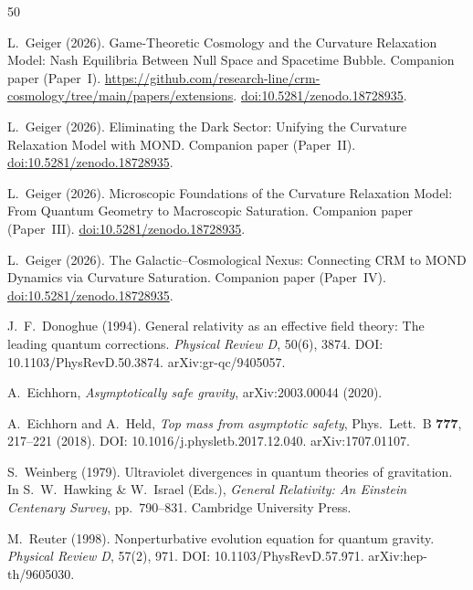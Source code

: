 \documentclass[aps,prd,twocolumn,superscriptaddress,nofootinbib]{revtex4-2}
\begin{document}
\begin{thebibliography}{50}

L.~Geiger (2026).
Game-Theoretic Cosmology and the Curvature Relaxation Model: Nash Equilibria Between Null Space and Spacetime Bubble.
Companion paper (Paper~I).
\url{https://github.com/research-line/crm-cosmology/tree/main/papers/extensions}.
\href{https://doi.org/10.5281/zenodo.18728935}{doi:10.5281/zenodo.18728935}.

L.~Geiger (2026).
Eliminating the Dark Sector: Unifying the Curvature Relaxation Model with MOND.
Companion paper (Paper~II).
\href{https://doi.org/10.5281/zenodo.18728935}{doi:10.5281/zenodo.18728935}.

L.~Geiger (2026).
Microscopic Foundations of the Curvature Relaxation Model: From Quantum Geometry to Macroscopic Saturation.
Companion paper (Paper~III).
\href{https://doi.org/10.5281/zenodo.18728935}{doi:10.5281/zenodo.18728935}.

L.~Geiger (2026).
The Galactic--Cosmological Nexus: Connecting CRM to MOND Dynamics via Curvature Saturation.
Companion paper (Paper~IV).
\href{https://doi.org/10.5281/zenodo.18728935}{doi:10.5281/zenodo.18728935}.

J.~F.~Donoghue (1994).
General relativity as an effective field theory: The leading quantum corrections.
\textit{Physical Review D}, 50(6), 3874.
DOI: 10.1103/PhysRevD.50.3874.
arXiv:gr-qc/9405057.

A.~Eichhorn,
\textit{Asymptotically safe gravity},
arXiv:2003.00044 (2020).

A.~Eichhorn and A.~Held,
\textit{Top mass from asymptotic safety},
Phys.\ Lett.\ B \textbf{777}, 217--221 (2018).
DOI: 10.1016/j.physletb.2017.12.040.
arXiv:1707.01107.

S.~Weinberg (1979).
Ultraviolet divergences in quantum theories of gravitation.
In S.~W.~Hawking \& W.~Israel (Eds.), \textit{General Relativity: An Einstein Centenary Survey}, pp.\ 790--831.
Cambridge University Press.

M.~Reuter (1998).
Nonperturbative evolution equation for quantum gravity.
\textit{Physical Review D}, 57(2), 971.
DOI: 10.1103/PhysRevD.57.971.
arXiv:hep-th/9605030.


\end{thebibliography}
\end{document}
